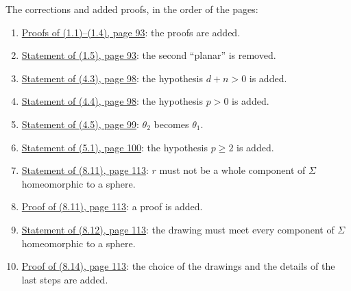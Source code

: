 The corrections and added proofs, in the order of the pages:
\begin{enumerate}\setlength{\itemsep}{1pt}
\item {}\hyperref[fix:1.1-1.4-proofs-added]{Proofs of (1.1)--(1.4), page 93}: the proofs are added.
\item {}\hyperref[fix:1.5]{Statement of (1.5), page 93}: the second ``planar'' is removed.
\item {}\hyperref[fix:4.3]{Statement of (4.3), page 98}: the hypothesis $d+n>0$ is added.
\item {}\hyperref[fix:4.4]{Statement of (4.4), page 98}: the hypothesis $p>0$ is added.
\item {}\hyperref[fix:4.5]{Statement of (4.5), page 99}: $\theta_2$ becomes $\theta_1$.
\item {}\hyperref[fix:5.1]{Statement of (5.1), page 100}: the hypothesis $p\ge 2$ is added.
\item {}\hyperref[fix:8.11]{Statement of (8.11), page 113}: $r$ must not be a whole component of $\Sigma$ homeomorphic to a sphere.
\item {}\hyperref[fix:8.11-proof-added]{Proof of (8.11), page 113}: a proof is added.
\item {}\hyperref[fix:8.12]{Statement of (8.12), page 113}: the drawing must meet every component of $\Sigma$ homeomorphic to a sphere.
\item {}\hyperref[fix:8.14-proof-added]{Proof of (8.14), page 113}: the choice of the drawings and the details of the last steps are added.
\end{enumerate}
